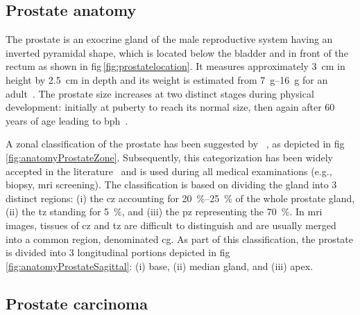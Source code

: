 \subsection{Prostate anatomy}\label{section:intro:anatomy}

The prostate is an exocrine gland of the male reproductive system having an
inverted pyramidal shape, which is located below the bladder and in front of
the rectum as shown in \acs{fig}\,\ref{fig:prostatelocation}.
It measures approximately \SI{3}{\cm} in height by \SI{2.5}{\cm} in depth and
its weight is estimated from \SIrange{7}{16}{\gram} for an
adult~\cite{Leissner1979}.
The prostate size increases at two distinct stages during physical development:
initially at puberty to reach its normal size, then again after 60 years of age
leading to \ac{bph}~\cite{Parfait2010}.

A zonal classification of the prostate has been suggested by
\citeauthor{McNeal1981}~\cite{McNeal1981}, as depicted in
\acs{fig}\,\ref{fig:anatomyProstateZone}.
Subsequently, this categorization has been widely accepted in the
literature~\cite{Hricak1987,Villers1991,Coakley2000,Parfait2010} and is used
during all medical examinations (e.g., biopsy, \ac{mri} screening).
The classification is based on dividing the gland into 3 distinct regions: (i)
the \ac{cz} accounting for \SIrange{20}{25}{\percent} of the whole prostate
gland, (ii) the \ac{tz} standing for \SI{5}{\percent}, and (iii) the \ac{pz}
representing the \SI{70}{\percent}.
In \ac{mri} images, tissues of \ac{cz} and \ac{tz} are difficult to distinguish
and are usually merged into a common region, denominated \ac{cg}.
As part of this classification, the prostate is divided into 3 longitudinal
portions depicted in \acs{fig}\,\ref{fig:anatomyProstateSagittal}: (i) base,
(ii) median gland, and (iii) apex.

\subsection{Prostate carcinoma}

